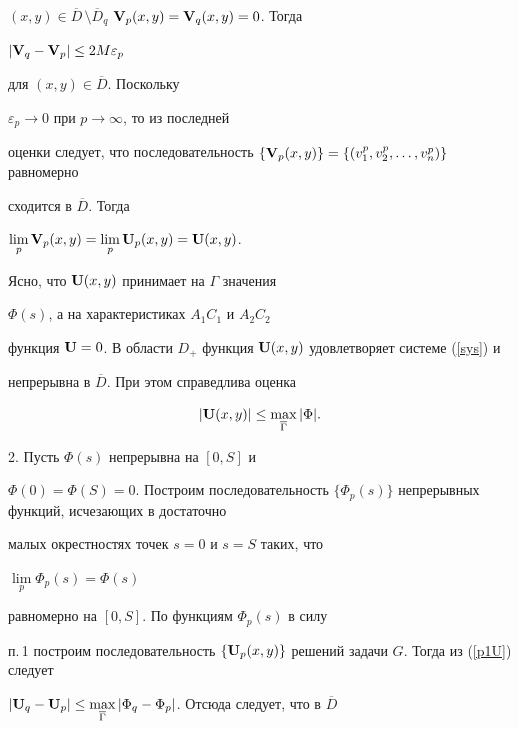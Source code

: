 $(x,y)\in \overline D\,\setminus \overline D_q$\; ${\bold


V}_p(x,y)={\bold V}_q(x,y)=0$. Тогда


$|{\bold V}_q-{\bold V}_p|\le 2M\varepsilon_p$


для $(x,y)\in \overline D$. Поскольку


$\varepsilon_p\to 0$ при $p\to \infty$, то из последней


оценки следует, что последовательность $\{{\bold


V}_p(x,y)\}=\{(v_1^p,v_2^p,\dotsc,v_n^p)\}$ равномерно


сходится в $\overline D$. Тогда


$\lim\limits_p{\bold V}_p(x,y)=\lim\limits_p{\bold U}_p(x,y)={\bold U}(x,y)$.


Ясно, что ${\bold U}(x,y)$ принимает на $\Gamma$ значения


$\Phi (s)$, а на характеристиках $A_1C_1$ и $A_2C_2$


функция ${\bold U}=0$. В области $D_+$ функция ${\bold


U}(x,y)$ удовлетворяет системе (\ref{sys}) и


непрерывна в $\overline D$. При этом справедлива оценка


\begin{equation}\label{p1U}


|{\bold U}(x,y)|\le \max_{\overline \Gamma}|\Phi|.


\end{equation}





2. Пусть $\Phi(s)$ непрерывна на $[0,S]$ и


$\Phi(0)=\Phi(S)=0$. Построим последовательность $\{\Phi


_p(s)\}$ непрерывных функций, исчезающих в достаточно


малых окрестностях точек $s=0$ и $s=S$ таких, что


$\lim\limits_p\Phi_p(s)=\Phi(s)$


равномерно на $[0,S]$. По функциям $\Phi_p(s)$ в силу


п.\,1 построим последовательность $\{{\bold


U}_p(x,y)\}$ решений задачи $G$. Тогда из (\ref{p1U}) следует


$|{\bold U}_q-{\bold U}_p|\le \max\limits_{\overline \Gamma


}|\Phi_q-\Phi_p|$. Отсюда следует, что в $\overline D$


